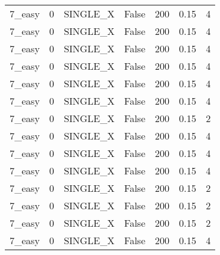 \begin{tabular}{lrllrrr}
 7\_easy        &              0 & SINGLE\_X        & False           &          200 &   0.15 &               4 \\
 7\_easy        &              0 & SINGLE\_X        & False           &          200 &   0.15 &               4 \\
 7\_easy        &              0 & SINGLE\_X        & False           &          200 &   0.15 &               4 \\
 7\_easy        &              0 & SINGLE\_X        & False           &          200 &   0.15 &               4 \\
 7\_easy        &              0 & SINGLE\_X        & False           &          200 &   0.15 &               4 \\
 7\_easy        &              0 & SINGLE\_X        & False           &          200 &   0.15 &               4 \\
 7\_easy        &              0 & SINGLE\_X        & False           &          200 &   0.15 &               2 \\
 7\_easy        &              0 & SINGLE\_X        & False           &          200 &   0.15 &               4 \\
 7\_easy        &              0 & SINGLE\_X        & False           &          200 &   0.15 &               4 \\
 7\_easy        &              0 & SINGLE\_X        & False           &          200 &   0.15 &               4 \\
 7\_easy        &              0 & SINGLE\_X        & False           &          200 &   0.15 &               2 \\
 7\_easy        &              0 & SINGLE\_X        & False           &          200 &   0.15 &               2 \\
 7\_easy        &              0 & SINGLE\_X        & False           &          200 &   0.15 &               2 \\
 7\_easy        &              0 & SINGLE\_X        & False           &          200 &   0.15 &               4 \\
\hline
\end{tabular}